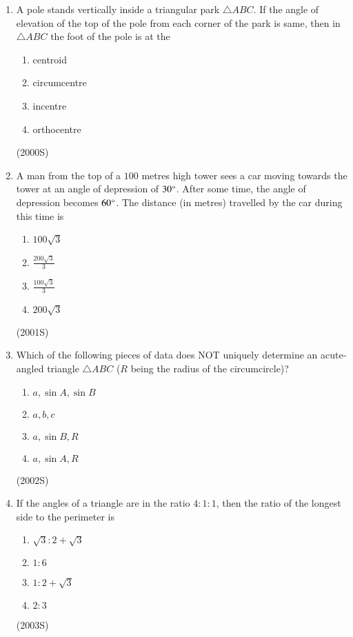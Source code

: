 \documentclass[journal,12pt,twocolumn]{IEEEtran}
\theoremstyle{remark}
\begin{document}
\begin{enumerate}
\item A pole stands vertically inside a triangular park $\triangle ABC$. If the angle of elevation of the top of the pole from each corner of the park is same, then in $\triangle ABC$ the foot of the pole is at the
\begin{enumerate}[label = (\alph*)]
\item centroid
\item circumcentre
\item incentre
\item orthocentre
\end{enumerate}
\hfill (2000S)\\

\item A man from the top of a $100$ metres high tower sees a car moving towards the tower at an angle of depression of $30\degree$. After some time, the angle of depression becomes $60\degree$. The distance (in metres) travelled by the car during this time is
\begin{enumerate}[label = (\alph*)]
\item $100\sqrt{3}$
\item $\frac{200\sqrt{3}}{3}$
\item $\frac{100\sqrt{3}}{3}$
\item $200\sqrt{3}$
\end{enumerate}
\hfill (2001S)\\

\item Which of the following pieces of data does NOT uniquely determine an acute-angled triangle $\triangle ABC$ ($R$ being the radius of the circumcircle)?
\begin{enumerate}[label = (\alph*)]
\item $a, \sin A, \sin B$
\item $a, b, c$
\item $a, \sin B, R$
\item $a, \sin A, R$
\end{enumerate}
\hfill (2002S)\\

\item If the angles of a triangle are in the ratio $4:1:1$, then the ratio of the longest side to the perimeter is
\begin{enumerate}[label = (\alph*)]
\item $\sqrt{3}:2+\sqrt{3}$
\item $1:6$
\item $1:2+\sqrt{3}$
\item $2:3$
\end{enumerate}
\hfill (2003S)\\


\end{enumerate}
\end{document}

